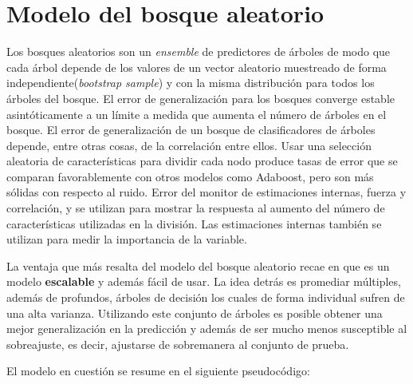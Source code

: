 \section{Modelo del bosque aleatorio}
Los bosques aleatorios son un \textit{ensemble} de predictores de árboles de modo que cada árbol depende de los valores de un vector aleatorio muestreado de forma independiente(\textit{bootstrap sample}) y con la misma distribución para todos los árboles del bosque. 
El error de generalización para los bosques converge estable asintóticamente a un límite a medida que aumenta el número de árboles en el bosque.
El error de generalización de un bosque de clasificadores de árboles depende, entre otras cosas, de la correlación entre ellos. Usar una selección aleatoria de características para dividir cada nodo produce
tasas de error que se comparan favorablemente con otros modelos como Adaboost, pero son más sólidas con respecto al ruido. Error del monitor de estimaciones internas,
fuerza y correlación, y se utilizan para mostrar la respuesta al aumento del número de características utilizadas
en la división. Las estimaciones internas también se utilizan para medir la importancia de la variable\cite{25}.

La ventaja que más resalta del modelo del bosque aleatorio recae en que es un modelo \textbf{escalable} y además fácil de usar. La idea detrás es promediar múltiples, además de profundos, 
árboles de decisión los cuales de forma individual sufren de una alta varianza. Utilizando este conjunto de árboles es posible obtener una mejor generalización en la predicción y además de ser mucho menos
susceptible al sobreajuste, es decir, ajustarse de sobremanera al conjunto de prueba\cite{24}.

El modelo en cuestión se resume en el siguiente pseudocódigo:

\newcommand{\INDSTATE}[1][1]{\STATE\hspace{#1\algorithmicindent}}

